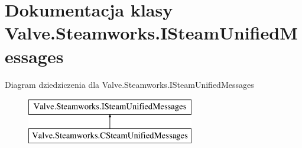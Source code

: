 \hypertarget{class_valve_1_1_steamworks_1_1_i_steam_unified_messages}{}\section{Dokumentacja klasy Valve.\+Steamworks.\+I\+Steam\+Unified\+Messages}
\label{class_valve_1_1_steamworks_1_1_i_steam_unified_messages}
Diagram dziedziczenia dla Valve.\+Steamworks.\+I\+Steam\+Unified\+Messages\begin{figure}[H]
\begin{center}
\leavevmode
\includegraphics[height=2.000000cm]{class_valve_1_1_steamworks_1_1_i_steam_unified_messages}
\end{center}
\end{figure}
